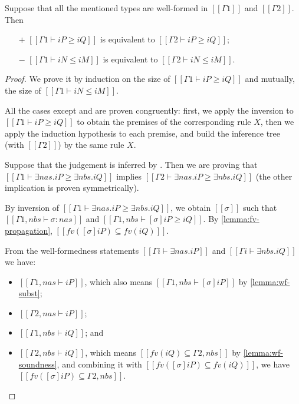 \begin{lemma}
  \label{lemma:subt-ctxt-irrelevance}
  Suppose that all the mentioned types are well-formed in $[[Γ1]]$ and $[[Γ2]]$. 
  Then 
  \begin{enumerate}
    \item[$+$] $[[Γ1 ⊢ iP ≥ iQ]]$ is equivalent to $[[Γ2 ⊢ iP ≥ iQ]]$;
    \item[$-$] $[[Γ1 ⊢ iN ≤ iM]]$ is equivalent to $[[Γ2 ⊢ iN ≤ iM]]$.
  \end{enumerate}
\end{lemma}
\begin{proof}
  We prove it by induction on 
  the size of $[[Γ1 ⊢ iP ≥ iQ]]$ and mutually,
  the size of $[[Γ1 ⊢ iN ≤ iM]]$.

  All the cases except  and 
  are proven congruently:
  first, we apply the inversion to $[[Γ1 ⊢ iP ≥ iQ]]$ to obtain the premises of the
  corresponding rule $X$, then we apply the induction hypothesis to each premise,
  and build the inference tree (with $[[Γ2]]$) by the same rule $X$. 

  Suppose that the judgement is inferred by .
  Then we are proving that $[[Γ1 ⊢ ∃nas.iP ≥ ∃nbs.iQ]]$ implies 
  $[[Γ2 ⊢ ∃nas.iP ≥ ∃nbs.iQ]]$ (the other implication is proven symmetrically).

  By inversion  of $[[Γ1 ⊢ ∃nas.iP ≥ ∃nbs.iQ]]$, 
  we obtain $[[σ]]$ such that $[[ Γ1, nbs ⊢ σ : nas]]$
  and $[[Γ1, nbs ⊢ [σ]iP ≥ iQ]]$.
  By \cref{lemma:fv-propagation}, $[[fv([σ]iP) ⊆ fv(iQ)]]$.

  From the well-formedness statements 
  $[[Γi ⊢ ∃nas.iP]]$ and $[[Γi ⊢ ∃nbs.iQ]]$ we have:
  \begin{itemize}
    \item $[[Γ1, nas ⊢ iP]]$, which also means $[[Γ1, nbs ⊢ [σ]iP]]$
      by \cref{lemma:wf-subst};
    \item $[[Γ2, nas ⊢ iP]]$;
    \item $[[Γ1, nbs ⊢ iQ]]$; and 
    \item $[[Γ2, nbs ⊢ iQ]]$, which means $[[ fv(iQ) ⊆ {Γ2, nbs} ]]$
      by \cref{lemma:wf-soundness},
      and  combining it with $[[fv([σ]iP) ⊆ fv(iQ)]]$, 
      we have $[[fv([σ]iP) ⊆ {Γ2, nbs}]]$.
  \end{itemize}


\end{proof}
